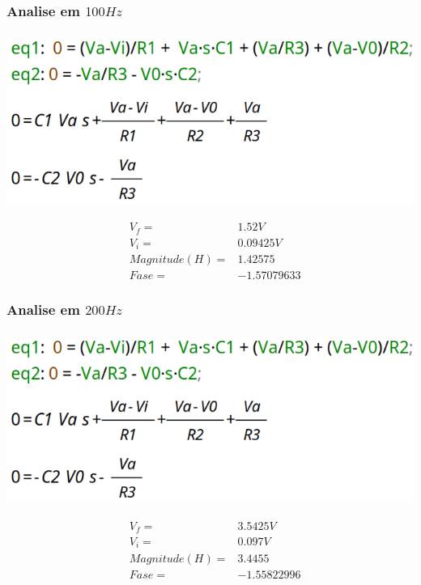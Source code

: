 \documentclass[12pt,twoside, a4paper, twocolumn]{article}
\begin{document}
\subsubsection{Analise em $100Hz$}
\subparagraph*{}


\begin{adjustbox}{scale=0.18}
    \includegraphics{eqs.png}
\end{adjustbox}


\begin{equation*}
    \begin{aligned}
         & V_f =          & 1.52V       \\
         & V_i =          & 0.09425V    \\
         & Magnitude(H) = & 1.42575     \\
         & Fase =         & -1.57079633
    \end{aligned}
\end{equation*}


\subsubsection{Analise em $200Hz$}
\subparagraph*{}


\begin{adjustbox}{scale=0.18}
    \includegraphics{eqs.png}
\end{adjustbox}


\begin{equation*}
    \begin{aligned}
         & V_f =          & 3.5425V     \\
         & V_i =          & 0.097V      \\
         & Magnitude(H) = & 3.4455      \\
         & Fase =         & -1.55822996
    \end{aligned}
\end{equation*}
\end{document}
